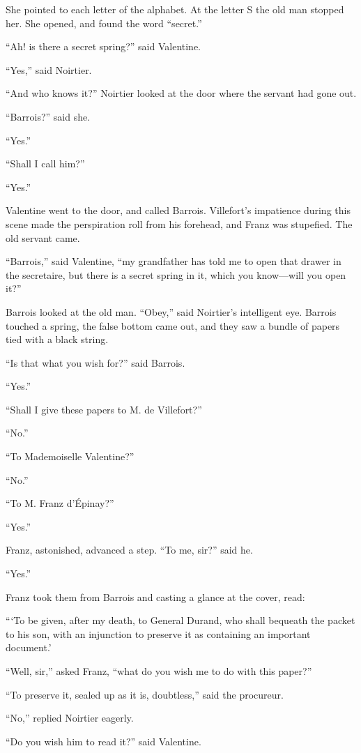 She pointed to each letter of the alphabet. At the letter S the old man
stopped her. She opened, and found the word “secret.”

“Ah! is there a secret spring?” said Valentine.

“Yes,” said Noirtier.

“And who knows it?” Noirtier looked at the door where the servant had
gone out.

“Barrois?” said she.

“Yes.”

“Shall I call him?”

“Yes.”

Valentine went to the door, and called Barrois. Villefort’s impatience
during this scene made the perspiration roll from his forehead, and
Franz was stupefied. The old servant came.

“Barrois,” said Valentine, “my grandfather has told me to open that
drawer in the secretaire, but there is a secret spring in it, which you
know—will you open it?”

Barrois looked at the old man. “Obey,” said Noirtier’s intelligent eye.
Barrois touched a spring, the false bottom came out, and they saw a
bundle of papers tied with a black string.

“Is that what you wish for?” said Barrois.

“Yes.”

“Shall I give these papers to M. de Villefort?”

“No.”

“To Mademoiselle Valentine?”

“No.”

“To M. Franz d’Épinay?”

“Yes.”

Franz, astonished, advanced a step. “To me, sir?” said he.

“Yes.”

Franz took them from Barrois and casting a glance at the cover, read:

“‘To be given, after my death, to General Durand, who shall bequeath
the packet to his son, with an injunction to preserve it as containing
an important document.’

“Well, sir,” asked Franz, “what do you wish me to do with this paper?”

“To preserve it, sealed up as it is, doubtless,” said the procureur.

“No,” replied Noirtier eagerly.

“Do you wish him to read it?” said Valentine.

